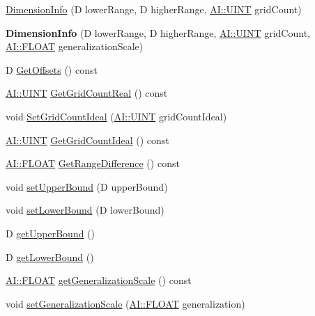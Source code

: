 \begin{DoxyCompactItemize}
\item 
\hyperlink{classAI_1_1Algorithm_1_1DimensionInfo_a81474f419c3763f3de2833c8edb378c4}{Dimension\+Info} (D lower\+Range, D higher\+Range, \hyperlink{namespaceAI_ab6e14dc1e659854858a87e511f1439ec}{A\+I\+::\+U\+I\+N\+T} grid\+Count)
\item 
\hypertarget{classAI_1_1Algorithm_1_1DimensionInfo_a1401520e0bfb6e50b064ab0d94b8d5ec}{{\bfseries Dimension\+Info} (D lower\+Range, D higher\+Range, \hyperlink{namespaceAI_ab6e14dc1e659854858a87e511f1439ec}{A\+I\+::\+U\+I\+N\+T} grid\+Count, \hyperlink{namespaceAI_a41b74884a20833db653dded3918e05c3}{A\+I\+::\+F\+L\+O\+A\+T} generalization\+Scale)}\label{classAI_1_1Algorithm_1_1DimensionInfo_a1401520e0bfb6e50b064ab0d94b8d5ec}

\item 
D \hyperlink{classAI_1_1Algorithm_1_1DimensionInfo_a20db996bd27cf32c94fa1365546bde98}{Get\+Offsets} () const 
\item 
\hyperlink{namespaceAI_ab6e14dc1e659854858a87e511f1439ec}{A\+I\+::\+U\+I\+N\+T} \hyperlink{classAI_1_1Algorithm_1_1DimensionInfo_a06b80f631364311d2e731ea6646a2232}{Get\+Grid\+Count\+Real} () const 
\item 
void \hyperlink{classAI_1_1Algorithm_1_1DimensionInfo_a44578552f80f0772396bdc0430059e9e}{Set\+Grid\+Count\+Ideal} (\hyperlink{namespaceAI_ab6e14dc1e659854858a87e511f1439ec}{A\+I\+::\+U\+I\+N\+T} grid\+Count\+Ideal)
\item 
\hyperlink{namespaceAI_ab6e14dc1e659854858a87e511f1439ec}{A\+I\+::\+U\+I\+N\+T} \hyperlink{classAI_1_1Algorithm_1_1DimensionInfo_a6f6590d1d331c55ff424196a16232d94}{Get\+Grid\+Count\+Ideal} () const 
\item 
\hyperlink{namespaceAI_a41b74884a20833db653dded3918e05c3}{A\+I\+::\+F\+L\+O\+A\+T} \hyperlink{classAI_1_1Algorithm_1_1DimensionInfo_ac00dab53a32a43aca17dcb48d8109436}{Get\+Range\+Difference} () const 
\item 
void \hyperlink{classAI_1_1Algorithm_1_1DimensionInfo_a9889cad59dddd038f7fbddbd2ac6ece4}{set\+Upper\+Bound} (D upper\+Bound)
\item 
void \hyperlink{classAI_1_1Algorithm_1_1DimensionInfo_adef1b2721242ef4ca4978a1ceb8d2474}{set\+Lower\+Bound} (D lower\+Bound)
\item 
D \hyperlink{classAI_1_1Algorithm_1_1DimensionInfo_a01eab7ae14a0653b6042afc93ec988c5}{get\+Upper\+Bound} ()
\item 
D \hyperlink{classAI_1_1Algorithm_1_1DimensionInfo_a21bdf660f342425445db64a1dea1fc2f}{get\+Lower\+Bound} ()
\item 
\hyperlink{namespaceAI_a41b74884a20833db653dded3918e05c3}{A\+I\+::\+F\+L\+O\+A\+T} \hyperlink{classAI_1_1Algorithm_1_1DimensionInfo_a82de90c2830def513911e4a3135ac2e2}{get\+Generalization\+Scale} () const 
\item 
void \hyperlink{classAI_1_1Algorithm_1_1DimensionInfo_a53462f78d4d95d27ccb421f519b3112a}{set\+Generalization\+Scale} (\hyperlink{namespaceAI_a41b74884a20833db653dded3918e05c3}{A\+I\+::\+F\+L\+O\+A\+T} generalization)
\end{DoxyCompactItemize}


